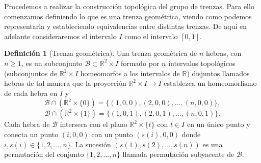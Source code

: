 \documentclass[12pt]{book}
\theoremstyle{definition}
\newtheorem{defi}{Definición}[section]
\begin{document}

Procedemos a realizar la construcción topológica del grupo de trenzas. Para ello comenzamos definiendo lo que es una trenza geométrica, viendo como podemos representarla y estableciendo equivalencias entre distintas trenzas. De aquí en adelante consideraremos el intervalo $I$ como el intervalo $[0,1]$.


\begin{defi}[Trenza geométrica]\label{trenza_geom}
Una trenza geométrica de $n$ hebras, con $n \geq 1$, es un subconjunto $\mathcal{B}\subset\mathbb{R}^2\times I$ formado por $n$ intervalos topológicos (subconjuntos de $\mathbb{R}^2\times I$ homeomorfos a los intervalos de $\mathbb{R}$) disjuntos llamados hebras de tal manera que la proyección $\mathbb{R}^2\times I\rightarrow I$ establezca un homeomorfismo de cada hebra en $I$ y
$$\mathcal{B}\cap(\mathbb{R}^2\times \{0\})=\{(1,0,0),(2,0,0),...,(n,0,0)\},$$
$$\mathcal{B}\cap(\mathbb{R}^2\times \{1\})=\{(1,0,1),(2,0,1),...,(n,0,1)\}.$$
Cada hebra de $\mathcal{B}$ interseca con el plano $\mathbb{R}^2\times \{t\}$ con $t\in I$ en un único punto y conecta un punto $(i,0,0)$ con un punto $(s(i),0,0)$ donde $i,s(i)\in\{1,2,...,n\}$. La sucesión $(s(1),s(2),...,s(n))$ es una permutación del conjunto $\{1,2,...,n\}$ llamada permutación subyacente de $\mathcal{B}$.
\end{defi}
\end{document}
